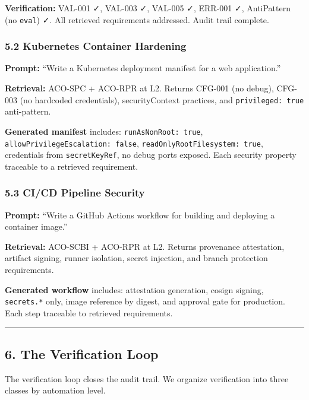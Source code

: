 \documentclass[
]{article}
\begin{document}
\textbf{Verification:} VAL-001 ✓, VAL-003 ✓, VAL-005 ✓, ERR-001 ✓,
AntiPattern (no \texttt{eval}) ✓. All retrieved requirements addressed.
Audit trail complete.

\subsubsection{5.2 Kubernetes Container
Hardening}\label{kubernetes-container-hardening}

\textbf{Prompt:} ``Write a Kubernetes deployment manifest for a web
application.''

\textbf{Retrieval:} ACO-SPC + ACO-RPR at L2. Returns CFG-001 (no debug),
CFG-003 (no hardcoded credentials), securityContext practices, and
\texttt{privileged:\ true} anti-pattern.

\textbf{Generated manifest} includes: \texttt{runAsNonRoot:\ true},
\texttt{allowPrivilegeEscalation:\ false},
\texttt{readOnlyRootFilesystem:\ true}, credentials from
\texttt{secretKeyRef}, no debug ports exposed. Each security property
traceable to a retrieved requirement.

\subsubsection{5.3 CI/CD Pipeline
Security}\label{cicd-pipeline-security}

\textbf{Prompt:} ``Write a GitHub Actions workflow for building and
deploying a container image.''

\textbf{Retrieval:} ACO-SCBI + ACO-RPR at L2. Returns provenance
attestation, artifact signing, runner isolation, secret injection, and
branch protection requirements.

\textbf{Generated workflow} includes: attestation generation, cosign
signing, \texttt{secrets.*} only, image reference by digest, and
approval gate for production. Each step traceable to retrieved
requirements.

\begin{center}\rule{0.5\linewidth}{0.5pt}\end{center}

\subsection{6. The Verification Loop}\label{the-verification-loop}

The verification loop closes the audit trail. We organize verification
into three classes by automation level.
\end{document}
